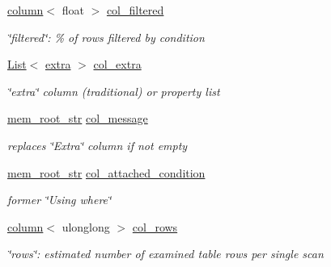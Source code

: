 \begin{DoxyCompactItemize}
\mbox{\label{classqep__row_a5e4571567e03e63bd4e70a0eae118213}} 
\mbox{\hyperlink{structqep__row_1_1column}{column}}$<$ float $>$ \mbox{\hyperlink{classqep__row_a5e4571567e03e63bd4e70a0eae118213}{col\+\_\+filtered}}
\begin{DoxyCompactList}\small\item\em \char`\"{}filtered\char`\"{}\+: \% of rows filtered by condition \end{DoxyCompactList}\item 
\mbox{\label{classqep__row_a15e92b0231fec2d0c09bffda5732eace}} 
\mbox{\hyperlink{classList}{List}}$<$ \mbox{\hyperlink{structqep__row_1_1extra}{extra}} $>$ \mbox{\hyperlink{classqep__row_a15e92b0231fec2d0c09bffda5732eace}{col\+\_\+extra}}
\begin{DoxyCompactList}\small\item\em \char`\"{}extra\char`\"{} column (traditional) or property list \end{DoxyCompactList}\item 
\mbox{\label{classqep__row_a146aabb5aeee23f442dc7611215a19f4}} 
\mbox{\hyperlink{structqep__row_1_1mem__root__str}{mem\+\_\+root\+\_\+str}} \mbox{\hyperlink{classqep__row_a146aabb5aeee23f442dc7611215a19f4}{col\+\_\+message}}
\begin{DoxyCompactList}\small\item\em replaces \char`\"{}\+Extra\char`\"{} column if not empty \end{DoxyCompactList}\item 
\mbox{\label{classqep__row_a3314e532ebe3f59bb8172bf775337ea2}} 
\mbox{\hyperlink{structqep__row_1_1mem__root__str}{mem\+\_\+root\+\_\+str}} \mbox{\hyperlink{classqep__row_a3314e532ebe3f59bb8172bf775337ea2}{col\+\_\+attached\+\_\+condition}}
\begin{DoxyCompactList}\small\item\em former \char`\"{}\+Using where\char`\"{} \end{DoxyCompactList}\item 
\mbox{\label{classqep__row_a49f3dd3644c386b9879a85951b8184b8}} 
\mbox{\hyperlink{structqep__row_1_1column}{column}}$<$ ulonglong $>$ \mbox{\hyperlink{classqep__row_a49f3dd3644c386b9879a85951b8184b8}{col\+\_\+rows}}
\begin{DoxyCompactList}\small\item\em \char`\"{}rows\char`\"{}\+: estimated number of examined table rows per single scan \end{DoxyCompactList}\item 

\end{DoxyCompactItemize}
